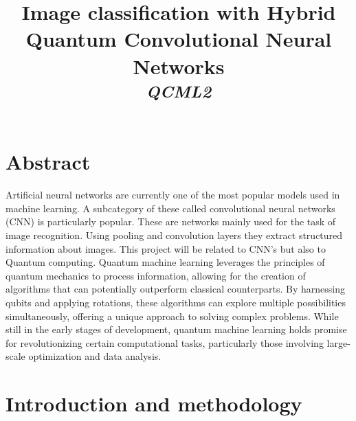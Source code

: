 \documentclass[conference]{IEEEtran}
\begin{document}
    \title{Image classification with Hybrid Quantum Convolutional Neural Networks\\
        {\footnotesize \textsuperscript{\textit{QCML2}}}
        }
    
        \author{
        \and
        }


    \maketitle

\newpage

\section*{\fontsize{16}{20}\selectfont Abstract}

\noindent
Artificial neural networks are currently one of the most popular models used in machine
learning. A subcategory of these called convolutional neural networks (CNN) is particularly popular. These are networks mainly used for the task of image recognition. Using
pooling and convolution layers they extract structured information about images. This
project will be related to CNN's but also to Quantum computing. Quantum machine
learning leverages the principles of quantum mechanics to process information, allowing
for the creation of algorithms that can potentially outperform classical counterparts. By
harnessing qubits and applying rotations, these algorithms can explore multiple possibilities
simultaneously, offering a unique approach to solving complex problems. While still in the
early stages of development, quantum machine learning holds promise for revolutionizing
certain computational tasks, particularly those involving large-scale optimization and data
analysis.

\section*{\fontsize{16}{20}\selectfont Introduction and methodology}
\end{document}
